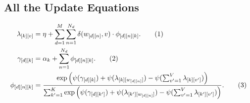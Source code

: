 \documentclass[12pt]{article}
\newcommand\numberthis{\addtocounter{equation}{1}\tag{\theequation}}
\begin{document}
\subsection{All the Update Equations}

\begin{align*}
    \lambda_{[k][v]} &= \eta + \sum_{d=1}^{M} \sum_{n=1}^{N_{d}}
    \delta(w_{[d][n]}, v)\cdot\phi_{[d][n][k]}.
    \numberthis\label{eq:lambdaupdate}
    \\*
    \gamma_{[d][k]} &= \alpha_{k} + \sum_{n=1}^{N_{d}} \phi_{[d][n][k]}.
    \numberthis\label{eq:gammaupdate}
    \\*
    \phi_{[d][n][k]} &= \frac{\exp \left( \psi(\gamma_{[d][k]})
    +
    \psi(\lambda_{[k][w_{[d][n]}]}) - \psi(\sum_{v'=1}^{V} \lambda_{[k][v']})
    \right)}
    {\sum_{k'=1}^{K} \exp \left( \psi(\gamma_{[d][k']})
    +
    \psi(\lambda_{[k'][w_{[d][n]}]}) - \psi(\sum_{v'=1}^{V}
    \lambda_{[k'][v']})
    \right)}.\numberthis\label{eq:phiupdate}
\end{align*}
\end{document}
